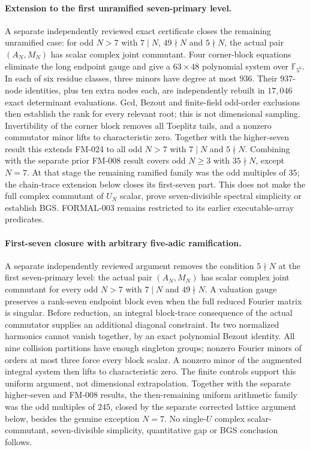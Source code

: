 \paragraph{Extension to the first unramified seven-primary level.}
A separate independently reviewed exact certificate closes the remaining
unramified case: for odd $N>7$ with $7\mid N$, $49\nmid N$ and $5\nmid N$,
the actual pair $(A_N,M_N)$ has scalar complex joint commutant.
Four corner-block equations eliminate the long endpoint gauge and give a
$63\times48$ polynomial system over $\mathbb F_{5^6}$. In each of six
residue classes, three minors have degree at most $936$. Their $937$-node
identities, plus ten extra nodes each, are independently rebuilt in
$17{,}046$ exact determinant evaluations. Gcd, Bezout and finite-field
odd-order exclusions then establish the rank for every relevant root;
this is not dimensional sampling. Invertibility of the corner block removes
all Toeplitz tails, and a nonzero commutator minor lifts to characteristic zero.
Together with the higher-seven result this extends FM-024 to all odd $N>7$
with $7\mid N$ and $5\nmid N$. Combining with the separate prior FM-008
result covers odd $N\ge3$ with $35\nmid N$, except $N=7$.
At that stage the remaining ramified family was the odd multiples of $35$; the chain-trace extension below closes its first-seven part.
This does not make the full complex commutant of $U_N$ scalar, prove
seven-divisible spectral simplicity or establish BGS. FORMAL-003 remains
restricted to its earlier executable-array predicates.

\paragraph{First-seven closure with arbitrary five-adic ramification.}
A separate independently reviewed argument removes the condition $5\nmid N$
at the first seven-primary level: the actual pair $(A_N,M_N)$ has scalar
complex joint commutant for every odd $N>7$ with $7\mid N$ and $49\nmid N$.
A valuation gauge preserves a rank-seven endpoint block even when the full
reduced Fourier matrix is singular. Before reduction, an integral block-trace
consequence of the actual commutator supplies an additional diagonal constraint.
Its two normalized harmonics cannot vanish together, by an exact polynomial
Bezout identity. All nine collision partitions have enough singleton groups;
nonzero Fourier minors of orders at most three force every block scalar.
A nonzero minor of the augmented integral system then lifts to characteristic
zero. The finite controls support this uniform argument, not dimensional
extrapolation. Together with the separate higher-seven and FM-008 results,
the then-remaining uniform arithmetic family was the odd multiples of $245$,
closed by the separate corrected lattice argument below,
besides the genuine exception $N=7$. No single-$U$ complex scalar-commutant,
seven-divisible simplicity, quantitative gap or BGS conclusion follows.
